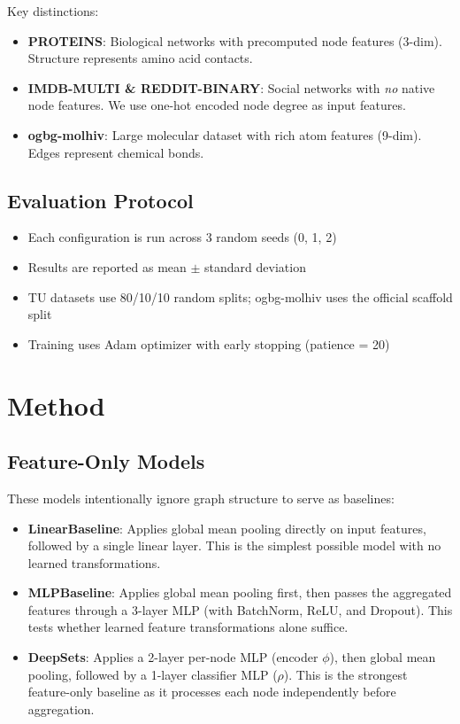 \documentclass[11pt]{article}
\begin{document}
Key distinctions:
\begin{itemize}
    \item \textbf{PROTEINS}: Biological networks with precomputed node features (3-dim). Structure represents amino acid contacts.
    \item \textbf{IMDB-MULTI \& REDDIT-BINARY}: Social networks with \textit{no} native node features. We use one-hot encoded node degree as input features.
    \item \textbf{ogbg-molhiv}: Large molecular dataset with rich atom features (9-dim). Edges represent chemical bonds.
\end{itemize}

\subsection{Evaluation Protocol}
\begin{itemize}
    \item Each configuration is run across 3 random seeds (0, 1, 2)
    \item Results are reported as mean $\pm$ standard deviation
    \item TU datasets use 80/10/10 random splits; ogbg-molhiv uses the official scaffold split
    \item Training uses Adam optimizer with early stopping (patience = 20)
\end{itemize}

\section{Method}

\subsection{Feature-Only Models}
These models intentionally ignore graph structure to serve as baselines:

\begin{itemize}
    \item \textbf{LinearBaseline}: Applies global mean pooling directly on input features, followed by a single linear layer. This is the simplest possible model with no learned transformations.
    \item \textbf{MLPBaseline}: Applies global mean pooling first, then passes the aggregated features through a 3-layer MLP (with BatchNorm, ReLU, and Dropout). This tests whether learned feature transformations alone suffice.
    \item \textbf{DeepSets}: Applies a 2-layer per-node MLP (encoder $\phi$), then global mean pooling, followed by a 1-layer classifier MLP ($\rho$). This is the strongest feature-only baseline as it processes each node independently before aggregation.
\end{itemize}
\end{document}
